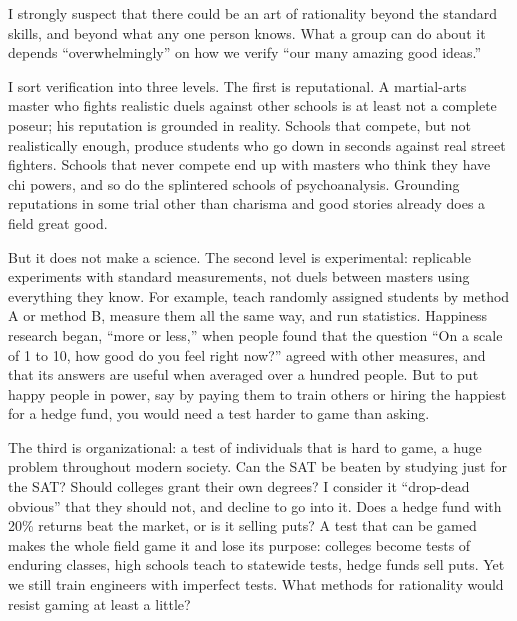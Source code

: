 
I strongly suspect that there could be an art of rationality beyond the standard skills, and beyond what any one person knows. What a group can do about it depends ``overwhelmingly'' on how we verify ``our many amazing good ideas.'' 

I sort verification into three levels. The first is reputational. A martial-arts master who fights realistic duels against other schools is at least not a complete poseur; his reputation is grounded in reality. Schools that compete, but not realistically enough, produce students who go down in seconds against real street fighters. Schools that never compete end up with masters who think they have chi powers, and so do the splintered schools of psychoanalysis. Grounding reputations in some trial other than charisma and good stories already does a field great good.

But it does not make a science. The second level is experimental: replicable experiments with standard measurements, not duels between masters using everything they know. For example, teach randomly assigned students by method A or method B, measure them all the same way, and run statistics. Happiness research began, ``more or less,'' when people found that the question ``On a scale of 1 to 10, how good do you feel right now?'' agreed with other measures, and that its answers are useful when averaged over a hundred people. But to put happy people in power, say by paying them to train others or hiring the happiest for a hedge fund, you would need a test harder to game than asking. 

The third is organizational: a test of individuals that is hard to game, a huge problem throughout modern society. Can the SAT be beaten by studying just for the SAT?  Should colleges grant their own degrees? I consider it ``drop-dead obvious'' that they should not, and decline to go into it. Does a hedge fund with 20\% returns beat the market, or is it selling puts?  A test that can be gamed makes the whole field game it and lose its purpose: colleges become tests of enduring classes, high schools teach to statewide tests, hedge funds sell puts. Yet we still train engineers with imperfect tests. What methods for rationality would resist gaming at least a little? 

